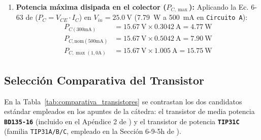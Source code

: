 \begin{enumerate}
    \item \textbf{Potencia máxima disipada en el colector ($P_{C,\max}$):} Aplicando la Ec. 6-63 de \cite{gonzalez_p2} ($P_C = V_{CE} \cdot I_C$) en $V_{in} = \SI{25,0}{\volt}$ (\SI{7,79}{\watt} a \SI{500}{\milli\ampere} en \texttt{Circuito A}):
    \begin{align}
        P_{C(300\text{mA})} &= \SI{15,67}{\volt} \times \SI{0,3042}{\ampere} = \SI{4,77}{\watt} \label{eq:pc_300}\\
        P_{C,\text{nom}(500\text{mA})} &= \SI{15,67}{\volt} \times \SI{0,5042}{\ampere} = \SI{7,90}{\watt} \label{eq:pc_500}\\
        P_{C,\max(1,0\text{A})} &= \SI{15,67}{\volt} \times \SI{1,005}{\ampere} = \SI{15,75}{\watt} \label{eq:pc_1000}
    \end{align}
\end{enumerate}

\subsection{Selección Comparativa del Transistor}
En la Tabla~\ref{tab:comparativa_transistores} se contrastan los dos candidatos estándar empleados en los apuntes de la cátedra: el transistor de media potencia \textbf{\texttt{BD135-16}} (incluido en el Apéndice 2 de \cite{gonzalez_p2}) y el transistor de potencia \textbf{\texttt{TIP31C}} (familia \texttt{TIP31A/B/C}, empleado en la Sección 6-9-5h de \cite{gonzalez_p3}).

